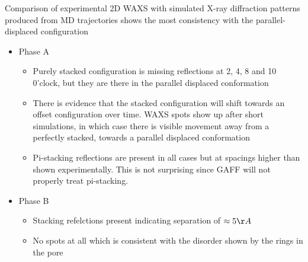 \documentclass{article}
\begin{document}
	Comparison of experimental 2D WAXS with simulated X-ray diffraction patterns produced from MD trajectories shows the most consistency with the parallel-displaced configuration
	\begin{itemize}
		\item Phase A
		\begin{itemize}	
			\item Purely stacked configuration is missing reflections at 2, 4, 8 and 10 0'clock, but they are there in the parallel displaced conformation
			\item There is evidence that the stacked configuration will shift towards an offset configuration over time. WAXS spots show up after short simulations, in which case there is visible movement away from a perfectly stacked, towards a parallel displaced conformation 
			\item Pi-stacking reflections are present in all cases but at spacings higher than shown experimentally. This is not surprising since GAFF will not properly treat pi-stacking.
		\end{itemize}
		\item Phase B
		\begin{itemize}
			\item Stacking refelctions present indicating separation of $ \approx 5 \AA $
			\item No spots at all which is consistent with the disorder shown by the rings in the pore
		\end{itemize}
	\end{itemize} 
\end{document}
